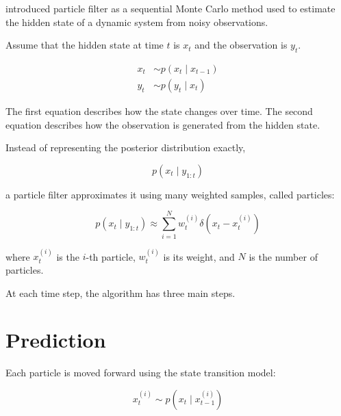 \documentclass[a4paper]{article}
\title{}
\date{}
\begin{document}
    \maketitle
    
    \cite{gordon-1993-novel-approach-to-nonlinear-non-gaussian-bayesian-state-estimation} introduced particle filter as a sequential Monte Carlo method used to estimate the hidden state of a dynamic system from noisy observations.
    
    Assume that the hidden state at time $t$ is $x_t$ and the observation is $y_t$.
    
    \begin{align}
        x_t &\sim p(x_t \mid x_{t-1}) \\
        y_t &\sim p(y_t \mid x_t)
    \end{align}
    
    The first equation describes how the state changes over time.
    The second equation describes how the observation is generated from the hidden state.
    
    Instead of representing the posterior distribution exactly,
    
    \begin{equation}
        p(x_t \mid y_{1:t})
    \end{equation}
    
    a particle filter approximates it using many weighted samples, called particles:
    
    \begin{equation}
        p(x_t \mid y_{1:t}) \approx \sum_{i=1}^{N} w_t^{(i)} \delta(x_t - x_t^{(i)})
    \end{equation}
    
    where $x_t^{(i)}$ is the $i$-th particle, $w_t^{(i)}$ is its weight, and $N$ is the number of particles.
    
    At each time step, the algorithm has three main steps.
    
    
    \section{Prediction}
        
        Each particle is moved forward using the state transition model:
        
        \begin{equation}
            x_t^{(i)} \sim p(x_t \mid x_{t-1}^{(i)})
        \end{equation}
    
\end{document}

